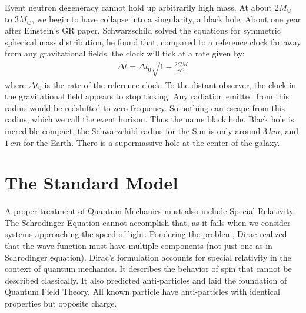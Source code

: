 \documentclass[11pt]{article}
\theoremstyle{break}
\theoremstyle{break}
\begin{document}
Event neutron degeneracy cannot hold up arbitrarily high mass. At about $2M_{\odot}$ to $3M_{\odot}$, we begin to have collapse into a singularity, a black hole. About one year after Einstein's GR paper, Schwarzschild solved the equations for symmetric spherical mass distribution, he found that, compared to a reference clock far away from any gravitational fields, the clock will tick at a rate given by:
\begin{align*}
\Delta t = \Delta t_0 \sqrt{1-\frac{2GM}{rc^2}}
\end{align*}
where $\Delta t_0$ is the rate of the reference clock. To the distant observer, the clock in the gravitational field appears to stop ticking. Any radiation
emitted from this radius would be redshifted to zero frequency. So nothing can escape from this
radius, which we call the event horizon. Thus the name black hole. Black hole is incredible compact, the Schwarzchild radius for the Sun is only around $3\, km$, and $1\, cm$ for the Earth. There is a supermassive hole at the center of the galaxy.\\




\newpage
\section{The Standard Model}
A proper treatment of  Quantum Mechanics must also include Special Relativity. The Schrodinger Equation cannot accomplish that, as it fails when we consider systems approaching the speed of light.
Pondering the problem, Dirac realized that the wave function must have multiple components (not just one as in Schrodinger equation).
Dirac's formulation accounts for special relativity in the context of quantum mechanics. It describes the behavior of spin that cannot be described classically. It also predicted anti-particles and laid the foundation of Quantum Field Theory. All known particle have anti-particles with identical properties but opposite charge.\\
\end{document}
